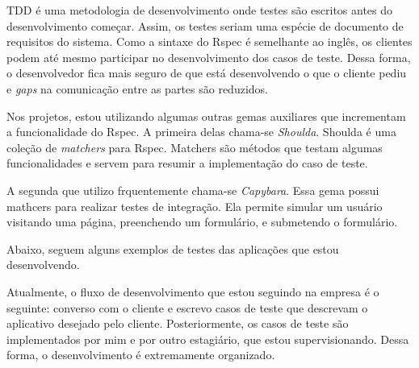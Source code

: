 TDD é uma metodologia de desenvolvimento onde testes são escritos antes do desenvolvimento começar. Assim, os testes seriam uma espécie de documento
de requisitos do sistema. Como a sintaxe do Rspec é semelhante ao inglês, os clientes podem até mesmo participar no desenvolvimento dos casos de teste.
Dessa forma, o desenvolvedor fica mais seguro de que está desenvolvendo o que o cliente pediu e \textit{gaps} na comunicação entre as partes são reduzidos.

Nos projetos, estou utilizando algumas outras gemas auxiliares que incrementam a funcionalidade do Rspec. A primeira delas chama-se \textit{Shoulda}. Shoulda
é uma coleção de \textit{matchers} para Rspec. Matchers são métodos que testam algumas funcionalidades e servem para resumir a implementação do
caso de teste.

A segunda que utilizo frquentemente chama-se \textit{Capybara}. Essa gema possui mathcers para realizar testes de integração. Ela permite simular um usuário
visitando uma página, preenchendo um formulário, e submetendo o formulário.

Abaixo, seguem alguns exemplos de testes das aplicações que estou desenvolvendo.


Atualmente, o fluxo de desenvolvimento que estou seguindo na empresa é o seguinte: converso com o cliente e escrevo casos de teste que descrevam o
aplicativo desejado pelo cliente. Posteriormente, os casos de teste são implementados por mim e por outro estagiário, que estou supervisionando. Dessa forma,
o desenvolvimento é extremamente organizado.
